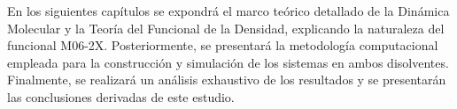 En los siguientes capítulos se expondrá el marco teórico detallado de la Dinámica Molecular y la Teoría del Funcional de la Densidad, explicando la naturaleza del funcional M06-2X. Posteriormente, se presentará la metodología computacional empleada para la construcción y simulación de los sistemas en ambos disolventes. Finalmente, se realizará un análisis exhaustivo de los resultados y se presentarán las conclusiones derivadas de este estudio.
